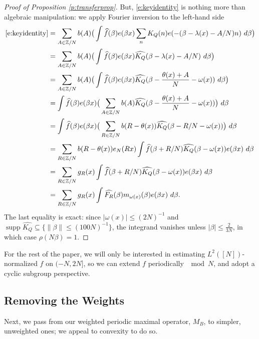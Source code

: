 \documentclass[12pt]{amsart}
\numberwithin{equation}{section}
\theoremstyle{definition}
\begin{document}
\begin{proof}[Proof of Proposition \ref{p:transferprop}]
But, \eqref{e:keyidentity} is nothing more than algebraic manipulation: we apply Fourier inversion to the left-hand side
\begin{align}
    \eqref{e:keyidentity} &= \sum_{A \in \mathbb{Z}/N} b(A) \big( \int \widehat{f}(\beta) e(\beta x) \sum_n K_Q(n) e(-(\beta - \lambda(x) - A/N) n) \ d\beta \big) \\
    & = \sum_{A \in \mathbb{Z}/N} b(A) \big( \int \widehat{f}(\beta) e(\beta x) \widehat{K_Q}(\beta - \lambda(x) - A/N) \ d\beta \big) \\
    & = \sum_{A \in \mathbb{Z}/N} b(A) \big( \int \widehat{f}(\beta) e(\beta x) \widehat{K_Q}(\beta - \frac{\theta(x) + A}{N} - \omega(x)) \ d\beta \big) \\
    & = \int \widehat{f}(\beta) e(\beta x) \big( \sum_{A \in \mathbb{Z}/N} b(A) \widehat{K_Q}(\beta - \frac{\theta(x) + A}{N} - \omega(x)) \big) \ d\beta \\
    & = \int \widehat{f}(\beta) e(\beta x) \big( \sum_{R \in \mathbb{Z}/N} b(R - \theta(x)) \widehat{K_Q}(\beta - R/N - \omega(x)) \big) \ d\beta \\
    & = \sum_{R \in \mathbb{Z}/N} b(R-\theta(x)) e_N(R x)  \int \widehat{f}(\beta + R/N) \widehat{K_Q}(\beta - \omega(x)) e(\beta x) \ d\beta \\
    & = \sum_{R \in \mathbb{Z}/N} g_R(x) \int \widehat{f}(\beta + R/N) \widehat{K_Q}(\beta - \omega(x)) e(\beta x) \ d\beta  \\ 
    & = \sum_{R \in \mathbb{Z}/N} g_R(x) \int \widehat{F_R}(\beta) m_{\omega(x)}(\beta) e(\beta x) \ d\beta.
\end{align}
The last equality is exact: since $|\omega(x)|\leq (2N)^{-1}$ and $\operatorname{supp}\widehat{K_Q}\subseteq\{\|\beta\|\leq(100N)^{-1}\}$, the integrand vanishes unless $|\beta|\leq \frac{2}{3N}$, in which case $\rho(N\beta)=1$.

\end{proof}

For the rest of the paper, we will only be interested in estimating $L^2([N])$-normalized $f$ on $(-N,2N]$, so we can extend $f$ periodically $\mod N$, and adopt a cyclic subgroup perspective. 


\subsection{Removing the Weights}
Next, we pass from our weighted periodic maximal operator, $M_B$, to simpler, unweighted ones; we appeal to convexity to do so. 
\end{document}
